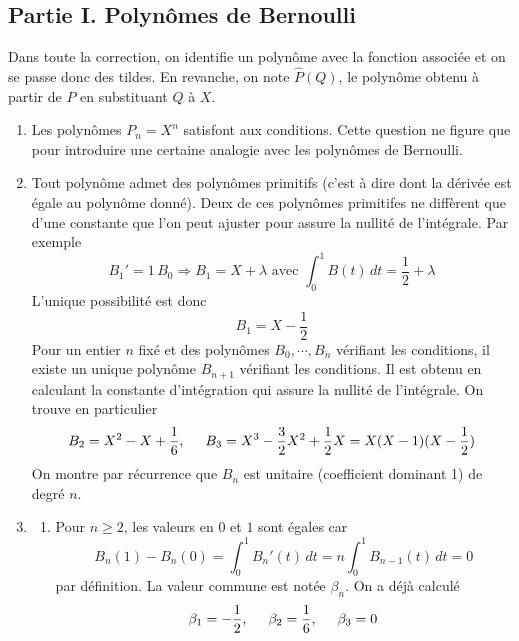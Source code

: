 \subsection*{Partie I. Polynômes de Bernoulli}
Dans toute la correction, on identifie un polynôme avec la fonction associée et on se passe donc des tildes. En revanche, on note $\widehat{P}(Q)$, le polynôme obtenu à partir de $P$ en substituant $Q$ à $X$.
\begin{enumerate}
  \item Les polynômes $P_n = X^n$ satisfont aux conditions. Cette question ne figure que pour introduire une certaine analogie avec les polynômes de Bernoulli. 

 \item Tout polynôme admet des polynômes primitifs (c'est à dire dont la dérivée est égale au polynôme donné). Deux de ces polynômes primitifes ne diffèrent que d'une constante que l'on peut ajuster pour assure la nullité de l'intégrale.
 Par exemple 
\begin{displaymath}
B_1'=1\,B_0 \Rightarrow B_1 = X + \lambda \text{ avec } \int_0^1B(t)\,dt = \frac{1}{2}+\lambda
\end{displaymath}
L'unique possibilité est donc 
\begin{displaymath}
  B_1 = X -\frac{1}{2}
\end{displaymath}
Pour un entier $n$ fixé et des polynômes $B_0,\cdots, B_n$ vérifiant les conditions, il existe un unique polynôme $B_{n+1}$ vérifiant les conditions. Il est obtenu en calculant la constante d'intégration qui assure la nullité de l'intégrale. On trouve en particulier
\begin{displaymath}
B_2 = X^2 - X + \frac{1}{6},\hspace{0.5cm}
B_3 = X^3 - \frac{3}{2}X^2 + \frac{1}{2}X = X(X-1)(X-\frac{1}{2})
\end{displaymath}
On montre par récurrence que $B_n$ est unitaire (coefficient dominant 1) de degré $n$.
 
 \item
\begin{enumerate}
 \item Pour $n\geq 2$, les valeurs en $0$ et $1$ sont égales car
\begin{displaymath}
 B_{n}(1)-B_{n}(0) = \int_0^1B_{n}'(t)\,dt = n \int_0^1B_{n-1}(t)\,dt = 0
\end{displaymath}
par définition. La valeur commune est notée $\beta_n$. On a déjà calculé
\begin{displaymath}
  \beta_1 = -\frac{1}{2},\hspace{0.5cm} \beta_2 = \frac{1}{6},\hspace{0.5cm}  \beta_3 = 0
\end{displaymath}


\end{enumerate}
\end{enumerate}
